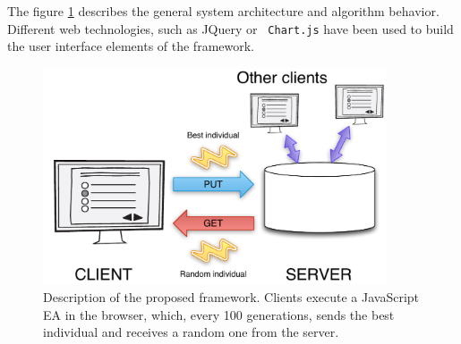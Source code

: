 \documentclass[journal,onecolumn]{IEEEtran}
\begin{document}
The figure \ref{fig:system} describes the general system architecture and
algorithm behavior. Different web technologies, such as JQuery or {\tt
  Chart.js} have
been used to build the user interface elements of the framework.
\begin{figure}[!t]
\centering
\includegraphics[width=4in]{system.pdf}
\caption{Description of the proposed framework. Clients execute a JavaScript EA
  in the browser, which, every 100 generations, sends the best
  individual and receives a random one from the server.}
\label{fig:system}
\end{figure}
\end{document}
